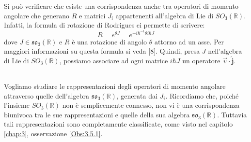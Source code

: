 \documentclass[12pt,a4paper]{report}
\theoremstyle{definition}
\theoremstyle{Theorem}
\theoremstyle{definition}
\theoremstyle{definition}
\theoremstyle{definition}
\begin{document}
Si può verificare che esiste una corrispondenza anche tra operatori di momento angolare che generano $\hat{R}$ e matrici $J_i$ appartenenti all'algebra di Lie di $SO_3(\mathbb{R})$. Infatti, la formula di rotazione di Rodrigues ci permette di scrivere:
$$R=e^{\theta J}=e^{-i\hbar^{-1}\theta i\hbar J}$$
dove $J\in \mathfrak{so_3}(\mathbb{R})$ e $R$ è una rotazione di angolo $\theta$ attorno ad un asse. Per maggiori informazioni su questa formula si veda [8]. Quindi, presa $J$ nell'algebra di Lie di $SO_3(\mathbb{R})$, possiamo associare ad ogni matrice $i\hbar J$ un operatore $\vec{v}\cdot\hat{\textbf{j}}$.\\
\\  
\begin{comment}
E' noto, per il teorema delle rotazioni di Eulero, che ogni rotazione nello spazio tridimensionale lascia un asse fisso, passante per il centro di rotazione. Inoltre, vale la seguente relazione:
$$R_z(\theta)=\begin{pmatrix}
cos(\theta)&-sin(\theta)&0\\
sin(\theta)&cos(\theta)&0\\
0&0&1
\end{pmatrix}=e^{\theta J_3}$$
L'operatore associato a questa matrice è $\hat{R_z(\theta)}=exp(-i\hbar^{-1}\theta \hat{j_z})$ dove $\hat{j_z}$ è un operatore di momento angolare.
Possiamo allora generalizzare attraverso la formula di Rodrigues e scrivere, per una generica rotazione: 
\end{comment}
	Vogliamo studiare le rappresentazioni degli operatori di momento angolare attraverso quelle dell'algebra $\mathfrak{so_3}(\mathbb{R})$, generata dai $J_i$. Ricordiamo che, poiché l'insieme $SO_3(\mathbb{R})$ non è semplicemente connesso, non vi è una corrispondenza biunivoca tra le sue rappresentazioni e quelle della sua algebra $\mathfrak{so_3}(\mathbb{R})$. Tuttavia tali rappresentazioni sono completamente classificate, come visto nel capitolo \ref{chap:3}, osservazione \ref{Obs:3.5.1}.
\end{document}
